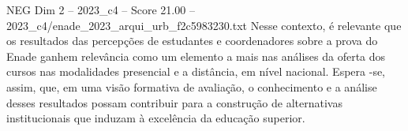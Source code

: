 \begin{textsample}{NEG Dim 2 – 2023\_c4 – Score 21.00 – 2023\_c4/enade\_2023\_arqui\_urb\_f2c5983230.txt}
Nesse contexto, é relevante que os resultados das percepções de estudantes e coordenadores sobre a prova do Enade ganhem relevância como um elemento a mais nas análises da oferta dos cursos nas modalidades presencial e a distância, em nível nacional.
Espera -se, assim, que, em uma visão formativa de avaliação, o conhecimento e a análise desses resultados possam contribuir para a construção de alternativas institucionais que induzam à excelência da educação superior.

\end{textsample}
